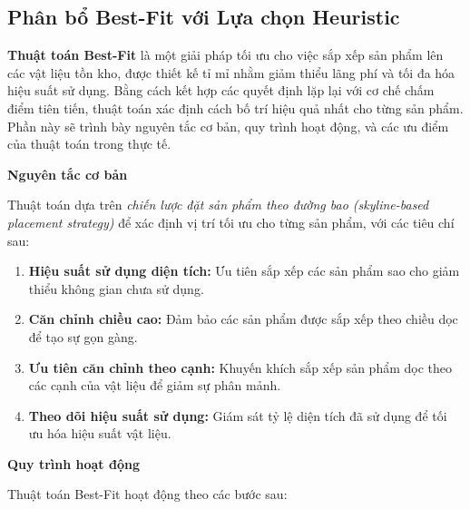 \subsection{Phân bổ Best-Fit với Lựa chọn Heuristic}

\hspace{0.5cm}\textbf{Thuật toán Best-Fit} là một giải pháp tối ưu cho việc sắp xếp sản phẩm lên các vật liệu tồn kho, được thiết kế tỉ mỉ nhằm giảm thiểu lãng phí và tối đa hóa hiệu suất sử dụng. Bằng cách kết hợp các quyết định lặp lại với cơ chế chấm điểm tiên tiến, thuật toán xác định cách bố trí hiệu quả nhất cho từng sản phẩm. Phần này sẽ trình bày nguyên tắc cơ bản, quy trình hoạt động, và các ưu điểm của thuật toán trong thực tế.

\vspace{0.3cm}
\noindent\textbf{Nguyên tắc cơ bản}

Thuật toán dựa trên \textit{chiến lược đặt sản phẩm theo đường bao (skyline-based placement strategy)} để xác định vị trí tối ưu cho từng sản phẩm, với các tiêu chí sau:
\begin{enumerate}
    \item \textbf{Hiệu suất sử dụng diện tích:} Ưu tiên sắp xếp các sản phẩm sao cho giảm thiểu không gian chưa sử dụng.
    \item \textbf{Căn chỉnh chiều cao:} Đảm bảo các sản phẩm được sắp xếp theo chiều dọc để tạo sự gọn gàng.
    \item \textbf{Ưu tiên căn chỉnh theo cạnh:} Khuyến khích sắp xếp sản phẩm dọc theo các cạnh của vật liệu để giảm sự phân mảnh.
    \item \textbf{Theo dõi hiệu suất sử dụng:} Giám sát tỷ lệ diện tích đã sử dụng để tối ưu hóa hiệu suất vật liệu.
\end{enumerate}

\vspace{0.3cm}
\noindent\textbf{Quy trình hoạt động}

Thuật toán Best-Fit hoạt động theo các bước sau:

